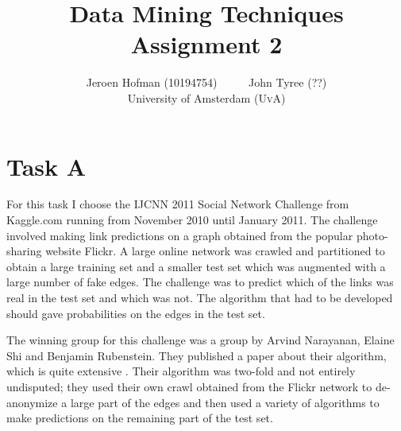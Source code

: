 \documentclass[a4]{article}
\author{Jeroen Hofman (10194754) \ \ \ \ \ John Tyree (??)  \\[15pt] University of Amsterdam (\textsc{UvA})}
\title{Data Mining Techniques\\
  Assignment 2
		}
\begin{document}
\maketitle
\captionsetup{width=0.8\textwidth}
\thispagestyle{empty}

\begin{center}
\begin{abstract}
\end{abstract}
\end{center}

\newpage
\tableofcontents
\newpage

\section{Task A}
For this task I choose the IJCNN 2011 Social Network Challenge from Kaggle.com running from November 2010 until January 2011. The challenge involved making link predictions on a graph obtained from the popular photo-sharing website Flickr. A large online network was crawled and partitioned to obtain a large training set and a smaller test set which was augmented with a large number of fake edges. The challenge was to predict which of the links was real in the test set and which was not. The algorithm that had to be developed should gave probabilities on the edges in the test set.

The winning group for this challenge was a group by Arvind Narayanan, Elaine Shi and Benjamin Rubenstein. They published a paper about their algorithm, which is quite extensive \cite{Narayanan}. Their algorithm was two-fold and not entirely undisputed; they used their own crawl obtained from the Flickr network to de-anonymize a large part of the edges and then used a variety of algorithms to make predictions on the remaining part of the test set.
\end{document}
